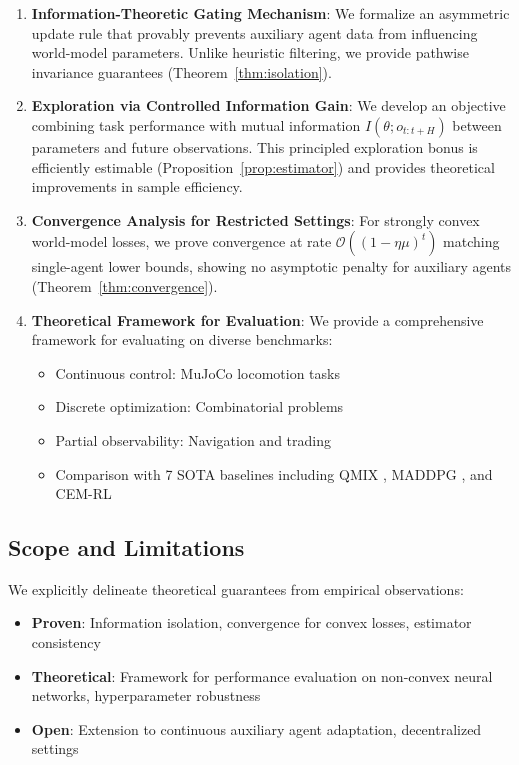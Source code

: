 \documentclass[12pt, a4paper]{article}
\begin{document}
\begin{enumerate}
\item \textbf{Information-Theoretic Gating Mechanism}: We formalize an asymmetric update rule that provably prevents auxiliary agent data from influencing world-model parameters. Unlike heuristic filtering, we provide pathwise invariance guarantees (Theorem~\ref{thm:isolation}).

\item \textbf{Exploration via Controlled Information Gain}: We develop an objective combining task performance with mutual information $I(\theta; o_{t:t+H})$ between parameters and future observations. This principled exploration bonus is efficiently estimable (Proposition~\ref{prop:estimator}) and provides theoretical improvements in sample efficiency.

\item \textbf{Convergence Analysis for Restricted Settings}: For strongly convex world-model losses, we prove convergence at rate $\mathcal{O}((1-\eta\mu)^t)$ matching single-agent lower bounds, showing no asymptotic penalty for auxiliary agents (Theorem~\ref{thm:convergence}).

\item \textbf{Theoretical Framework for Evaluation}: We provide a comprehensive framework for evaluating on diverse benchmarks:
\begin{itemize}
   \item Continuous control: MuJoCo locomotion tasks
   \item Discrete optimization: Combinatorial problems  
   \item Partial observability: Navigation and trading
   \item Comparison with 7 SOTA baselines including QMIX \cite{rashid2018qmix}, MADDPG \cite{lowe2017multi}, and CEM-RL \cite{pourchot2018cem}
\end{itemize}
\end{enumerate}

\subsection{Scope and Limitations}

We explicitly delineate theoretical guarantees from empirical observations:
\begin{itemize}
\item \textbf{Proven}: Information isolation, convergence for convex losses, estimator consistency
\item \textbf{Theoretical}: Framework for performance evaluation on non-convex neural networks, hyperparameter robustness
\item \textbf{Open}: Extension to continuous auxiliary agent adaptation, decentralized settings
\end{itemize}
\end{document}
